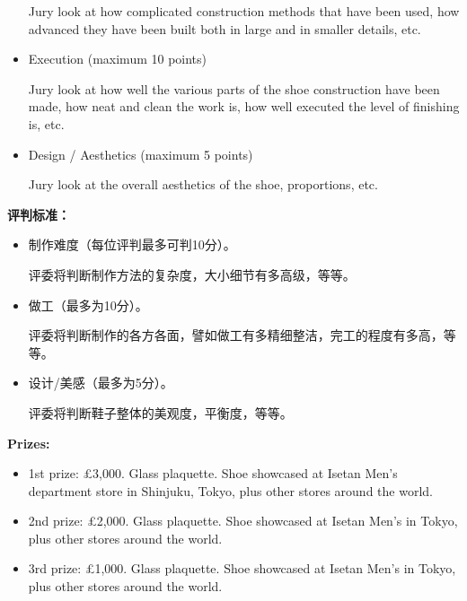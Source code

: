 \begin{paracol}{2}
\begin{itemize}
            Jury look at how complicated construction methods that have been used, how advanced they have been built both in large and in smaller details, etc.

            \item Execution (maximum 10 points)

            Jury look at how well the various parts of the shoe construction have been made, how neat and clean the work is, how well executed the level of finishing is, etc.

            \item Design / Aesthetics (maximum 5 points)

            Jury look at the overall aesthetics of the shoe, proportions, etc.
        \end{itemize}

        \switchcolumn
        \textbf{评判标准：}
        \begin{itemize}
            \item 制作难度（每位评判最多可判10分）。

            评委将判断制作方法的复杂度，大小细节有多高级，等等。

            \item 做工（最多为10分）。

            评委将判断制作的各方各面，譬如做工有多精细整洁，完工的程度有多高，等等。

            \item 设计/美感（最多为5分）。

            评委将判断鞋子整体的美观度，平衡度，等等。
        \end{itemize}
        \switchcolumn*

        \textbf{Prizes:}
        \begin{itemize}
            \item 1st prize: £3,000. Glass plaquette. Shoe showcased at Isetan Men’s department store in Shinjuku, Tokyo, plus other stores around the world.
            \item 2nd prize: £2,000. Glass plaquette. Shoe showcased at Isetan Men’s in Tokyo, plus other stores around the world.
            \item 3rd prize: £1,000. Glass plaquette. Shoe showcased at Isetan Men’s in Tokyo, plus other stores around the world.
        \end{itemize}

        \vspace{1em}


\end{paracol}
